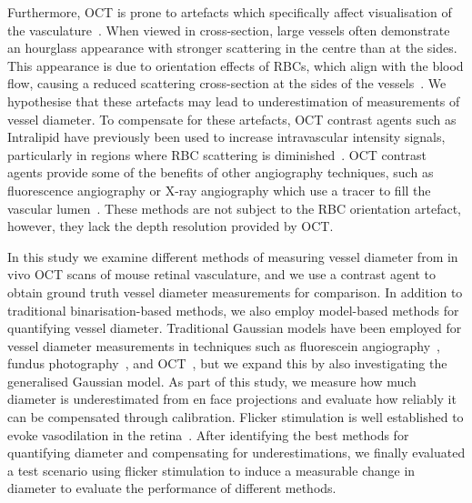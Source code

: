 Furthermore, OCT is prone to artefacts which specifically affect visualisation of the vasculature~\cite{cimallaShearFlowinducedOptical2011,zhuVisibilityMicrovesselsOptical2020,bernucciInvestigationArtifactsRetinal2018}. When viewed in cross-section, large vessels often demonstrate an hourglass appearance with stronger scattering in the centre than at the sides. This appearance is due to orientation effects of RBCs, which align with the blood flow, causing a reduced scattering cross-section at the sides of the vessels~\cite{cimallaShearFlowinducedOptical2011}. We hypothesise that these artefacts may lead to underestimation of measurements of vessel diameter. To compensate for these artefacts, OCT contrast agents such as Intralipid have previously been used to increase intravascular intensity signals, particularly in regions where RBC scattering is diminished~\cite{panUltrasensitiveDetection3D2014,merkleDynamicContrastOptical2016,merkleLaminarMicrovascularTransit2016,zhuVisibilityMicrovesselsOptical2020,bernucciInvestigationArtifactsRetinal2018}. OCT contrast agents provide some of the benefits of other angiography techniques, such as fluorescence angiography or X-ray angiography which use a tracer to fill the vascular lumen~\cite{hammerLineScanningLaser2006,hammerAngiographyMultifunctionalLine2012,garroneQuantitativeCoronaryAngiography2009}. These methods are not subject to the RBC orientation artefact, however, they lack the depth resolution provided by OCT.

In this study we examine different methods of measuring vessel diameter from in vivo OCT scans of mouse retinal vasculature, and we use a contrast agent to obtain ground truth vessel diameter measurements for comparison. In addition to traditional binarisation-based methods, we also employ model-based methods for quantifying vessel diameter. Traditional Gaussian models have been employed for vessel diameter measurements in techniques such as fluorescein angiography~\cite{zhouDetectionQuantificationRetinopathy1994}, fundus photography~\cite{lowellMeasurementRetinalVessel2004}, and OCT~\cite{leahyMapping3DConnectivity2015}, but we expand this by also investigating the generalised Gaussian model. As part of this study, we measure how much diameter is underestimated from en face projections and evaluate how reliably it can be compensated through calibration. Flicker stimulation is well established to evoke vasodilation in the retina~\cite{garhoferDiffuseLuminanceFlicker2004,sharifizadFactorsDeterminingFlickerinduced2016,michelsonFlickeringLightIncreases2002,aschingerEffectofDiffuse2017,kornfieldRegulationBloodFlow2014,shihQuantitativeRetinalChoroidal2013,sonOpticalCoherenceTomography2016}. After identifying the best methods for quantifying diameter and compensating for underestimations, we finally evaluated a test scenario using flicker stimulation to induce a measurable change in diameter to evaluate the performance of different methods.